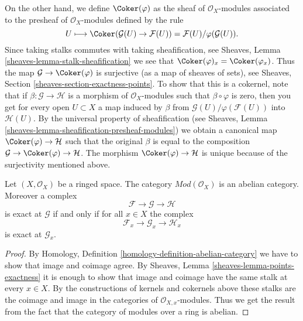 \medskip\noindent
On the other hand, we define
$\Coker(\varphi)$ as the sheaf of $\mathcal{O}_X$-modules
associated to the presheaf of $\mathcal{O}_X$-modules defined
by the rule
$$
U
\longmapsto
\Coker(\mathcal{G}(U)\to \mathcal{F}(U)) =
\mathcal{F}(U)/\varphi(\mathcal{G}(U)).
$$
Since taking stalks commutes with taking sheafification, see
Sheaves, Lemma \ref{sheaves-lemma-stalk-sheafification} we
see that $\Coker(\varphi)_x = \Coker(\varphi_x)$.
Thus the map $\mathcal{G} \to \Coker(\varphi)$ is surjective
(as a map of sheaves of sets),
see Sheaves, Section \ref{sheaves-section-exactness-points}.
To show that this is a cokernel, note that if
$\beta : \mathcal{G} \to \mathcal{H}$ is a morphism of $\mathcal{O}_X$-modules
such that $\beta \circ \varphi$ is zero, then you get for every
open $U \subset X$ a map induced by $\beta$ from
$\mathcal{G}(U)/\varphi(\mathcal{F}(U))$ into $\mathcal{H}(U)$.
By the universal property of sheafification (see
Sheaves, Lemma \ref{sheaves-lemma-sheafification-presheaf-modules})
we obtain a canonical map $\Coker(\varphi) \to \mathcal{H}$
such that the original $\beta$ is equal to
the composition
$\mathcal{G} \to \Coker(\varphi) \to \mathcal{H}$.
The morphism $\Coker(\varphi) \to \mathcal{H}$ is unique
because of the surjectivity mentioned above.

\begin{lemma}
\label{lemma-abelian}
Let $(X, \mathcal{O}_X)$ be a ringed space. The category
$\textit{Mod}(\mathcal{O}_X)$ is an abelian category. Moreover
a complex
$$
\mathcal{F} \to \mathcal{G} \to \mathcal{H}
$$
is exact at $\mathcal{G}$ if and only if for all $x \in X$ the
complex
$$
\mathcal{F}_x \to \mathcal{G}_x \to \mathcal{H}_x
$$
is exact at $\mathcal{G}_x$.
\end{lemma}

\begin{proof}
By Homology, Definition \ref{homology-definition-abelian-category}
we have to show that image and coimage agree. By Sheaves,
Lemma \ref{sheaves-lemma-points-exactness} it is enough to show
that image and coimage have the same stalk at every $x \in X$.
By the constructions of kernels and cokernels above these stalks
are the coimage and image in the categories of $\mathcal{O}_{X, x}$-modules.
Thus we get the result from the fact that the category of modules
over a ring is abelian.
\end{proof}


